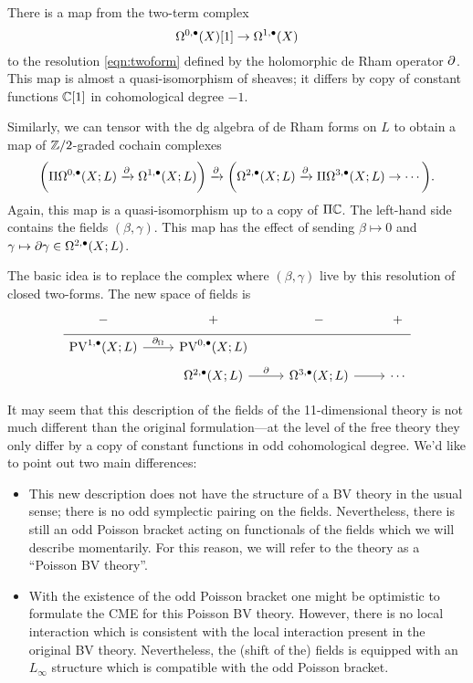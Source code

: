 \documentclass[11pt]{amsart}
\begin{document}
There is a map from the two-term complex 
\[
\Omega^{0,\bullet}(X)[1] \to \Omega^{1,\bullet}(X)
\]
to the resolution \eqref{eqn:twoform} defined by the holomorphic de Rham operator $\partial$. 
This map is almost a quasi-isomorphism of sheaves; it differs by copy of constant functions $\mathbb C[1]$ in cohomological degree $-1$. 

Similarly, we can tensor with the dg algebra of de Rham forms on $L$ to obtain a map of $\mathbb Z/2$-graded cochain complexes
\[
\bigg(\Pi \Omega^{0,\bullet}(X;L) \xrightarrow{\partial} \Omega^{1,\bullet}(X;L) \bigg) \xrightarrow{\partial} \bigg(\Omega^{2,\bullet}(X;L) \xrightarrow{\partial} \Pi \Omega^{3,\bullet}(X;L) \to \cdots \bigg) .
\]
Again, this map is a quasi-isomorphism up to a copy of $\Pi \mathbb C$.
The left-hand side contains the fields $(\beta, \gamma)$. 
This map has the effect of sending $\beta \mapsto 0$ and $\gamma \mapsto \partial \gamma \in \Omega^{2,\bullet}(X;L)$. 

The basic idea is to replace the complex where $(\beta,\gamma)$ live by this resolution of closed two-forms. 
The new space of fields is 
\begin{equation}
  \label{eq:poissfields} 
  \begin{tikzcd}[row sep = 1 ex]
     - & + & - & + \\ \hline
     \PV^{1,\bu}(X; L) \ar[r, "\div"] & \PV^{0,\bu}(X; L) \\
     & \Omega^{2,\bu}(X;L) \ar[r, "\del"] & \Omega^{3,\bu}(X;L) \ar[r] & \cdots 
\end{tikzcd}
\end{equation}

It may seem that this description of the fields of the 11-dimensional theory is not much different than the original formulation---at the level of the free theory they only differ by a copy of constant functions in odd cohomological degree. 
We'd like to point out two main differences:
\begin{itemize}
\item This new description does not have the structure of a BV theory in the usual sense; there is no odd symplectic pairing on the fields. 
Nevertheless, there is still an odd Poisson bracket acting on functionals of the fields which we will describe momentarily. 
For this reason, we will refer to the theory as a ``Poisson BV theory''. 
\item With the existence of the odd Poisson bracket one might be optimistic to formulate the CME for this Poisson BV theory.
However, there is no local interaction which is consistent with the local interaction present in the original BV theory. 
Nevertheless, the (shift of the) fields is equipped with an $L_\infty$ structure which is compatible with the odd Poisson bracket. 
\end{itemize}
\end{document}

